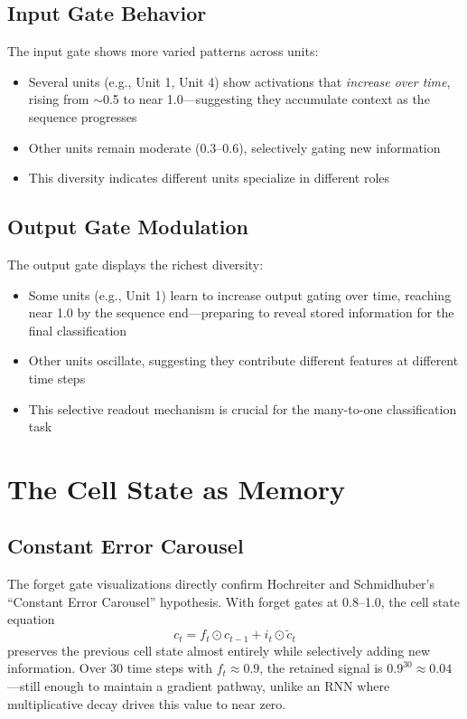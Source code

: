 \documentclass[12pt]{article}
\begin{document}
\subsection*{Input Gate Behavior}
The input gate shows more varied patterns across units:
\begin{itemize}
    \item Several units (e.g., Unit 1, Unit 4) show activations that \textit{increase over time}, rising from $\sim$0.5 to near 1.0---suggesting they accumulate context as the sequence progresses
    \item Other units remain moderate (0.3--0.6), selectively gating new information
    \item This diversity indicates different units specialize in different roles
\end{itemize}

\subsection*{Output Gate Modulation}
The output gate displays the richest diversity:
\begin{itemize}
    \item Some units (e.g., Unit 1) learn to increase output gating over time, reaching near 1.0 by the sequence end---preparing to reveal stored information for the final classification
    \item Other units oscillate, suggesting they contribute different features at different time steps
    \item This selective readout mechanism is crucial for the many-to-one classification task
\end{itemize}

\section*{The Cell State as Memory}

\subsection*{Constant Error Carousel}
The forget gate visualizations directly confirm Hochreiter and Schmidhuber's ``Constant Error Carousel'' hypothesis. With forget gates at 0.8--1.0, the cell state equation
\begin{equation}
    c_t = f_t \odot c_{t-1} + i_t \odot \tilde{c}_t
\end{equation}
preserves the previous cell state almost entirely while selectively adding new information. Over 30 time steps with $f_t \approx 0.9$, the retained signal is $0.9^{30} \approx 0.04$---still enough to maintain a gradient pathway, unlike an RNN where multiplicative decay drives this value to near zero.
\end{document}
